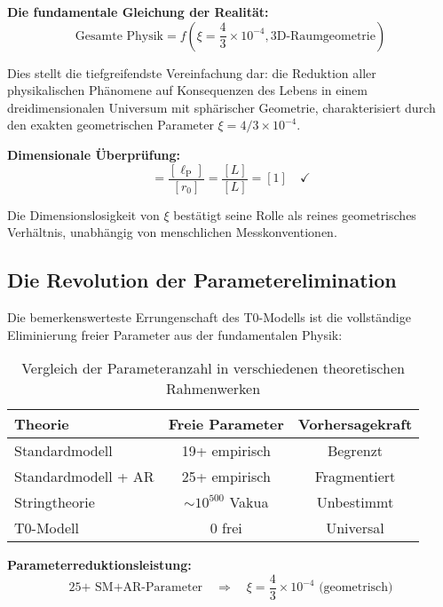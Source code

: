 \documentclass[12pt,a4paper]{report}
\newcommand{\lP}{\ell_{\text{P}}}         %
\newcommand{\rzero}{r_0}                  %
\begin{document}
	\textbf{Die fundamentale Gleichung der Realität:}
	\begin{equation}
		\boxed{\text{Gesamte Physik} = f\left(\xi = \frac{4}{3} \times 10^{-4}, \text{3D-Raumgeometrie}\right)}
	\end{equation}
	
	Dies stellt die tiefgreifendste Vereinfachung dar: die Reduktion aller physikalischen Phänomene auf Konsequenzen des Lebens in einem dreidimensionalen Universum mit sphärischer Geometrie, charakterisiert durch den exakten geometrischen Parameter $\xi = 4/3 \times 10^{-4}$.
	
	\textbf{Dimensionale Überprüfung:}
	\begin{equation}
		[\xi] = \frac{[\lP]}{[\rzero]} = \frac{[L]}{[L]} = [1] \quad \checkmark
	\end{equation}
	
	Die Dimensionslosigkeit von $\xi$ bestätigt seine Rolle als reines geometrisches Verhältnis, unabhängig von menschlichen Messkonventionen.
	
	\subsection{Die Revolution der Parameterelimination}
	\label{subsec:parameter_elimination}
	
	Die bemerkenswerteste Errungenschaft des T0-Modells ist die vollständige Eliminierung freier Parameter aus der fundamentalen Physik:
	
	\begin{table}[htbp]
		\centering
		\begin{tabular}{lcc}
			\toprule
			\textbf{Theorie} & \textbf{Freie Parameter} & \textbf{Vorhersagekraft} \\
			\midrule
			Standardmodell & 19+ empirisch & Begrenzt \\
			Standardmodell + AR & 25+ empirisch & Fragmentiert \\
			Stringtheorie & $\sim 10^{500}$ Vakua & Unbestimmt \\
			T0-Modell & 0 frei & Universal \\
			\bottomrule
		\end{tabular}
		\caption{Vergleich der Parameteranzahl in verschiedenen theoretischen Rahmenwerken}
		\label{tab:parameter_comparison}
	\end{table}
	
	\textbf{Parameterreduktionsleistung:}
	\begin{equation}
		\text{25+ SM+AR-Parameter} \quad \Rightarrow \quad \xi = \frac{4}{3} \times 10^{-4} \text{ (geometrisch)}
	\end{equation}
	
\end{document}
